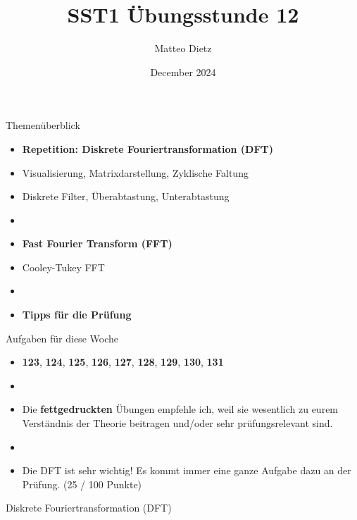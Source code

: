 \documentclass[14pt, aspectratio=169, handout]{beamer}
\title{SST1 Übungsstunde 12}
\author{Matteo Dietz}
\date{December 2024}
\begin{document}
\maketitle

\begin{frame}{Themenüberblick}
    \begin{itemize}
        \item \textbf{Repetition: Diskrete Fouriertransformation (DFT)}
        \item[] Visualisierung, Matrixdarstellung, Zyklische Faltung
        \item[] Diskrete Filter, Überabtastung, Unterabtastung
        \item[] 
        \item \textbf{Fast Fourier Transform (FFT)}
        \item[] Cooley-Tukey FFT
        \item[] 
        \item \textbf{Tipps für die Prüfung}
    \end{itemize}
\end{frame}

\begin{frame}{Aufgaben für diese Woche}
    \begin{itemize}
        \item[] \textbf{123}, \textbf{124}, \textbf{125}, \textbf{126}, \textbf{127}, \textbf{128}, \textbf{129}, \textbf{130}, \textbf{131}
        \item[] 
        \item[] Die \textbf{fettgedruckten} Übungen empfehle ich, weil sie wesentlich zu eurem Verständnis der Theorie beitragen und/oder sehr prüfungsrelevant sind.
        \item[] 
        \item[] Die DFT ist \textcolor{myred}{sehr wichtig}! Es kommt immer eine ganze Aufgabe dazu an der Prüfung. (25 / 100 Punkte)
    \end{itemize}
\end{frame}

\begin{frame}{Diskrete Fouriertransformation (DFT)}
\end{frame}
\end{document}
